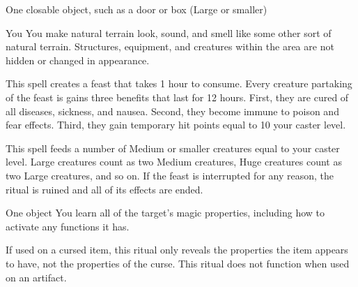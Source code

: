 \begin{spelltarget}{One closable object, such as a door or box (Large or smaller)}
\begin{spelltarget}{You}
\spelleffect You make natural terrain look, sound, and smell like some other sort of natural terrain. Structures, equipment, and creatures within the area are not hidden or changed in appearance.

\spelleffect This spell creates a feast that takes 1 hour to consume. Every creature partaking of the feast is gains three benefits that last for 12 hours. First, they are cured of all diseases, sickness, and nausea. Second, they become immune to poison and fear effects. Third, they gain temporary hit points equal to 10 \add your caster level.

This spell feeds a number of Medium or smaller creatures equal to your caster level. Large creatures count as two Medium creatures, Huge creatures count as two Large creatures, and so on.
\spellnotes If the feast is interrupted for any reason, the ritual is ruined and all of its effects are ended.

\begin{spelltarget}{One object}
    \spelleffect You learn all of the target's magic properties, including how to activate any functions it has.
\end{spelltarget}
\spellnotes If used on a cursed item, this ritual only reveals the properties the item appears to have, not the properties of the curse. This ritual does not function when used on an artifact.


\end{spelltarget}
\end{spelltarget}
